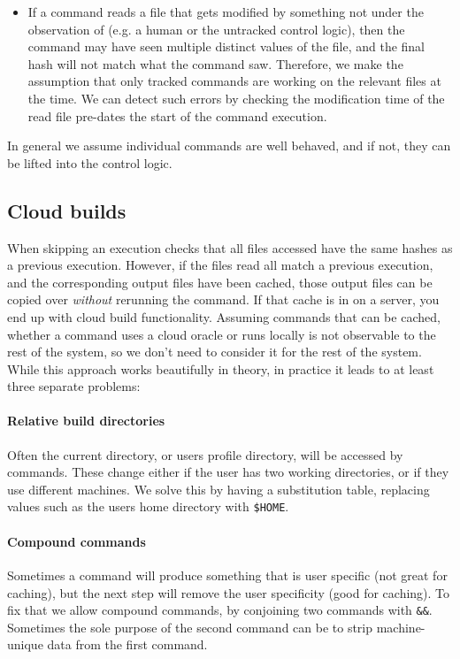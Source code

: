 \begin{itemize}
\item If a command reads a file that gets modified by something not under the observation of \Rattle (e.g. a human or the untracked control logic), then the command may have seen multiple distinct values of the file, and the final hash will not match what the command saw. Therefore, we make the assumption that only \Rattle tracked commands are working on the relevant files at the time. We can detect such errors by checking the modification time of the read file pre-dates the start of the command execution.
\end{itemize}

In general we assume individual commands are well behaved, and if not, they can be lifted into the control logic.

\subsection{Cloud builds}
\label{sec:cloud_builds}

When skipping an execution \Rattle checks that all files accessed have the same hashes as a previous execution. However, if the files read all match a previous execution, and the corresponding output files have been cached, those output files can be copied over \emph{without} rerunning the command. If that cache is in on a server, you end up with cloud build functionality. Assuming commands that can be cached, whether a command uses a cloud oracle or runs locally is not observable to the rest of the system, so we don't need to consider it for the rest of the system. While this approach works beautifully in theory, in practice it leads to at least three separate problems:

\paragraph{Relative build directories} Often the current directory, or users profile directory, will be accessed by commands. These change either if the user has two working directories, or if they use different machines. We solve this by having a substitution table, replacing values such as the users home directory with \texttt{\$HOME}.

\paragraph{Compound commands} Sometimes a command will produce something that is user specific (not great for caching), but the next step will remove the user specificity (good for caching). To fix that we allow compound commands, by conjoining two commands with \texttt{\&\&}. Sometimes the sole purpose of the second command can be to strip machine-unique data from the first command.

